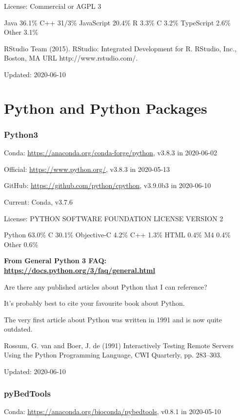 \documentclass[]{article}
\begin{document}
License: Commercial or AGPL 3

Java 36.1\% C++ 31/3\% JavaScript 20.4\% R 3.3\% C 3.2\% TypeScript 2.6\% Other 3.1\% 

RStudio Team (2015). RStudio: Integrated Development for R. RStudio, Inc., Boston, MA URL http://www.rstudio.com/.

Updated: 2020-06-10





\part{Python and Python Packages}

\section{Python3}

Conda: \url{https://anaconda.org/conda-forge/python}, v3.8.3 in 2020-06-02

Official: \url{https://www.python.org/}, v3.8.3 in 2020-05-13

GitHub: \url{https://github.com/python/cpython}, v3.9.0b3 in 2020-06-10

Current: Conda, v3.7.6

License: PYTHON SOFTWARE FOUNDATION LICENSE VERSION 2

Python 63.0\% C 30.1\% Objective-C 4.2\% C++ 1.3\% HTML 0.4\% M4 0.4\% Other 0.6\% 

\textbf{From General Python 3 FAQ: \url{https://docs.python.org/3/faq/general.html}}

Are there any published articles about Python that I can reference?

It's probably best to cite your favourite book about Python.

The very first article about Python was written in 1991 and is now quite outdated.

Rossum, G. van and Boer, J. de (1991) Interactively Testing Remote Servers Using the Python Programming Language, CWI Quarterly, pp. 283–303.

Updated: 2020-06-10

\section{pyBedTools}

Conda: \url{https://anaconda.org/bioconda/pybedtools}, v0.8.1 in 2020-05-10
\end{document}
